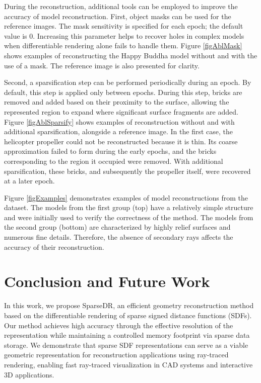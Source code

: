 \documentclass{ieeeaccess}
\begin{document}
During the reconstruction, additional tools can be employed to improve the accuracy of model reconstruction. First, object masks can be used for the reference images. The mask sensitivity is specified for each epoch; the default value is 0. Increasing this parameter helps to recover holes in complex models when differentiable rendering alone fails to handle them. Figure \ref{figAblMask} shows examples of reconstructing the Happy Buddha model without and with the use of a mask. The reference image is also presented for clarity.

Second, a sparsification step can be performed periodically during an epoch. By default, this step is applied only between epochs. During this step, bricks are removed and added based on their proximity to the surface, allowing the represented region to expand where significant surface fragments are added. Figure \ref{figAblSparsify} shows examples of reconstruction without and with additional sparsification, alongside a reference image. In the first case, the helicopter propeller could not be reconstructed because it is thin. Its coarse approximation failed to form during the early epochs, and the bricks corresponding to the region it occupied were removed. With additional sparsification, these bricks, and subsequently the propeller itself, were recovered at a later epoch.

Figure \ref{figExamples} demonstrates examples of model reconstructions from the dataset. The models from the first group (top) have a relatively simple structure and were initially used to verify the correctness of the method. The models from the second group (bottom) are characterized by highly relief surfaces and numerous fine details. Therefore, the absence of secondary rays affects the accuracy of their reconstruction.

\section{Conclusion and Future Work}

In this work, we propose SparseDR, an efficient geometry reconstruction method based on the differentiable rendering of sparse signed distance functions (SDFs). Our method achieves high accuracy through the effective resolution of the representation while maintaining a controlled memory footprint via sparse data storage. We demonstrate that sparse SDF representations can serve as a viable geometric representation for reconstruction applications using ray-traced rendering, enabling fast ray-traced visualization in CAD systems and interactive 3D applications.
\end{document}
